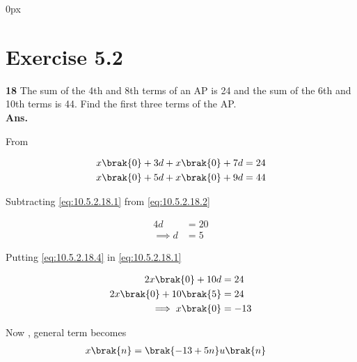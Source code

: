 \documentclass[journal,12pt,twocolumn]{IEEEtran}
\begin{document}
\parindent 0px


\vspace{3cm}

\title{}
\author{EE23BTECH11042 -  Khusinadha Naik$^{*}$
}
\maketitle
\newpage
\bigskip



\section*{Exercise 5.2}

\noindent \textbf{18} \hspace{2pt}The sum of the 4th and 8th terms of an AP is 24 and the sum of the 6th and 10th terms is 44. Find the first three terms of the AP.\\
\noindent \textbf{Ans.}\\
\fi

\begin{table}[h]

\end{table}

\noindent From 

\begin{align}
x\brak{0}+3d + x\brak{0}+7d &= 24 \label{eq:10.5.2.18.1}\\
x\brak{0}+5d + x\brak{0}+9d &= 44 \label{eq:10.5.2.18.2}
\end{align}

\noindent Subtracting \eqref{eq:10.5.2.18.1} from \eqref{eq:10.5.2.18.2}

\begin{align}
4d &= 20 \\
\implies d &= 5  \label{eq:10.5.2.18.4}
\end{align}

\noindent Putting \eqref{eq:10.5.2.18.4} in \eqref{eq:10.5.2.18.1}

\begin{align}
2x\brak{0} + 10d &= 24 \\
2x\brak{0} + 10\brak{5} &= 24 \\
\implies x\brak{0} &= -13
\end{align}

Now , general term becomes
\begin{align}
x\brak{n} &= \brak{-13 + 5n}u\brak{n}
\end{align}
\end{document}
